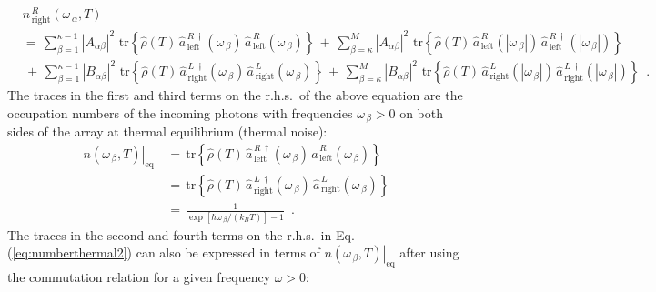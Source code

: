 %
\begin{equation} \label{eq:numberthermal2} 
\begin{split}
& n_{\,\text{right}}^{\,R}(\omega_{\,\alpha}, T)  \\[3mm]
& = \, \sum\limits_{\beta=1}^{\kappa-1} \left|A_{\alpha \beta}\right|^2 \, \,
\text{tr} \left\{ \hat{\rho}(T) \,
\hat{a}_{\,\text{left}}^{\,R\,\dagger}(\omega_{\,\beta}) \, 
\hat{a}_{\,\text{left}}^{\,R}(\omega_{\,\beta})  
\right\} 
\, + \,
\sum\limits_{\beta=\kappa}^{M} \left|A_{\alpha \beta}\right|^2 \, \,
\text{tr} \left\{ \hat{\rho}(T) \,
\hat{a}_{\,\text{left}}^{\,R}(|\omega_{\,\beta}|) \, 
\hat{a}_{\,\text{left}}^{\,R\,\dagger}(|\omega_{\,\beta}|)  
\right\} \\[3mm]
& \, + \, \sum\limits_{\beta=1}^{\kappa-1} \left|B_{\alpha \beta}\right|^2 \, \,
\text{tr} \left\{ \hat{\rho}(T) \,
\hat{a}_{\,\text{right}}^{\,L\,\dagger}(\omega_{\,\beta}) \, 
\hat{a}_{\,\text{right}}^{\,L}(\omega_{\,\beta})  
\right\} 
\, + \,
\sum\limits_{\beta=\kappa}^{M} \left|B_{\alpha \beta}\right|^2 \, \,
\text{tr} \left\{ \hat{\rho}(T) \,
\hat{a}_{\,\text{right}}^{\,L}(|\omega_{\,\beta}|) \, 
\hat{a}_{\,\text{right}}^{\,L\,\dagger}(|\omega_{\,\beta}|)  
\right\}
\, \, \, .
\end{split}
\end{equation}
%
The traces in the first and third terms on the r.h.s.~of the above equation
are the occupation numbers of the incoming photons with frequencies $\omega_{\,\beta}>0$
on both sides of the array at thermal equilibrium (thermal noise):
%
\begin{equation} \label{eq:ton}
\begin{split}
\left. n(\omega_{\,\beta}, T) \right|_{\text{eq}} \, & = \, 
        \text{tr} \left\{ \hat{\rho}(T) \,
\hat{a}_{\,\text{left}}^{\,R\,\dagger}(\omega_{\,\beta}) \, 
\hat{a}_{\,\text{left}}^{\,R}(\omega_{\,\beta})  \right\} \\[4mm]
& = \, \text{tr} \left\{ \hat{\rho}(T) \,
\hat{a}_{\,\text{right}}^{\,L\,\dagger}(\omega_{\,\beta}) \, 
\hat{a}_{\,\text{right}}^{\,L}(\omega_{\,\beta})  \right\} \\[3mm]
& = \, \displaystyle{\frac{1}{\exp\left[ \hbar \omega_{\,\beta} / (k_B T) \right] - 1}} \, \, \, .
\end{split}
\end{equation} 
%
The traces in the second and fourth terms on the r.h.s.~in Eq.\,(\ref{eq:numberthermal2})
can also be expressed in terms of $\left. n(\omega_{\,\beta}, T) \right|_{\text{eq}}$
after using the commutation relation for a given frequency $\omega > 0$:
